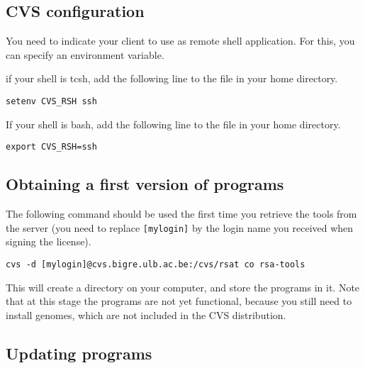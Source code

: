 \documentclass{book}
\begin{document}
\subsection{CVS configuration}

You need to indicate your  client to use 
as remote shell application. For this, you can specify an environment
variable.

if your shell is tcsh, add the following line to the 
file in your home directory.

\begin{footnotesize}
\begin{verbatim}
setenv CVS_RSH ssh
\end{verbatim}
\end{footnotesize}


If your shell is bash, add the following line to the 
file in your home directory.

\begin{footnotesize}
\begin{verbatim}
export CVS_RSH=ssh
\end{verbatim}
\end{footnotesize}



\subsection{Obtaining a first version of \RSAT programs}

The following command should be used the first time you retrieve the
tools from the server (you need to replace \texttt{[mylogin]} by the
login name you received when signing the \RSAT license).

\begin{footnotesize}
\begin{verbatim}
cvs -d [mylogin]@cvs.bigre.ulb.ac.be:/cvs/rsat co rsa-tools
\end{verbatim}
\end{footnotesize}


This will create a directory  on your computer, and
store the programs in it. Note that at this stage the programs are not
yet functional, because you still need to install genomes, which are
not included in the CVS distribution.

\subsection{Updating \RSAT programs}
\end{document}
